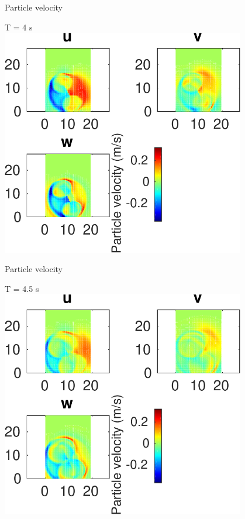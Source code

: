 \documentclass{beamer}
\begin{document}
\begin{frame}
 {Particle velocity}
 
 \centering \Large T = 4 s\\
 \includegraphics[width=0.8\textwidth]{images/horizontal_velo_00046}
 
\end{frame}

\begin{frame}
 {Particle velocity}
 
 \centering \Large T = 4.5 s\\
 \includegraphics[width=0.8\textwidth]{images/horizontal_velo_00051}
 
\end{frame}
\end{document}
